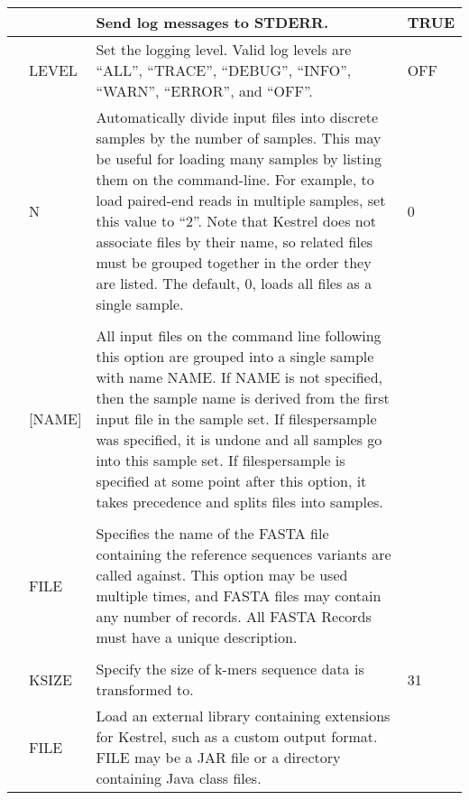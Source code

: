 \begin{small}
\begin{longtable}{|p{\optwidth}|p{\argwidth}|p{\dscwidth}|p{}|}
		\lopt{logstderr} & &
		Send log messages to STDERR.
		& TRUE
		\\ \hline
		
		\lopt{loglevel} & LEVEL &
		Set the logging level. Valid log levels are ``ALL'', ``TRACE'', ``DEBUG'', ``INFO'', ``WARN'', ``ERROR'', and ``OFF''.
		& OFF
		\\ \hline
		
		\lopt{filespersample} & N &
		Automatically divide input files into discrete samples by the number of samples. This may be useful for loading many samples by listing them on the command-line. For example, to load paired-end reads in multiple samples, set this value to ``2''. Note that Kestrel does not associate files by their name, so related files must be grouped together in the order they are listed. The default, $0$, loads all files as a single sample.
		& 0
		\\ \hline
		
		\optbox{\sopt{s}\\\lopt{sample}} & [NAME] &
		All input files on the command line following this option are grouped into a single sample with name NAME. If NAME is not specified, then the sample name is derived from the first input file in the sample set. If \ddash{}filespersample was specified, it is undone and all samples go into this sample set. If \ddash{}filespersample is specified at some point after this option, it takes precedence and splits files into samples.
		&
		\\ \hline
		
		\optbox{\sopt{r}\\\lopt{ref}} & FILE &
		Specifies the name of the FASTA file containing the reference sequences variants are called against. This option may be used multiple times, and FASTA files may contain any number of records. All FASTA Records must have a unique description.
		&
		\\ \hline
		
		\optbox{\sopt{k}\\\lopt{ksize}} & KSIZE &
		Specify the size of k-mers sequence data is transformed to.
		& 31
		\\ \hline
		
		\lopt{lib} & FILE &
		Load an external library containing extensions for Kestrel, such as a custom output format. FILE may be a JAR file or a directory containing Java class files.
		&
		\\ \hline
		

\end{longtable}
\end{small}

